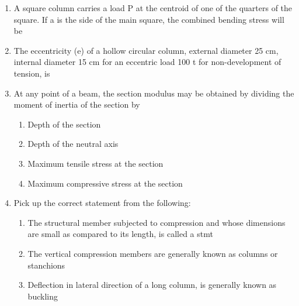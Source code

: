 \documentclass[11pt,a4paper]{article}
\begin{document}
\begin{enumerate}
\item{A square column carries a load P at the centroid of one of the quarters of the square. If a is the side of the main square, the combined bending stress will be}
\\
\item{The eccentricity (e) of a hollow circular column, external diameter 25 cm, internal diameter 15 cm for an eccentric load 100 t for non-development of tension, is}
\\\begin{enumerate*}[itemjoin=\qquad, label=\Alph*.]
\item{2.75 cm}
\item{3.00 cm}
\item{3.50 cm}
\item{4.25 cm}
\end{enumerate*}
\item{At any point of a beam, the section modulus may be obtained by dividing the moment of inertia of the section by}
\begin{enumerate}[label=\Alph*.]
\item{Depth of the section}
\item{Depth of the neutral axis}
\item{Maximum tensile stress at the section}
\item{Maximum compressive stress at the section}
\end{enumerate}
\item{Pick up the correct statement from the following:}
\begin{enumerate}[label=\Alph*.]
\item{The structural member subjected to compression and whose dimensions are small as compared to its length, is called a stmt}
\item{The vertical compression members are generally known as columns or stanchions}
\item{Deflection in lateral direction of a long column, is generally known as buckling}

\end{enumerate}
\end{enumerate}
\end{document}

